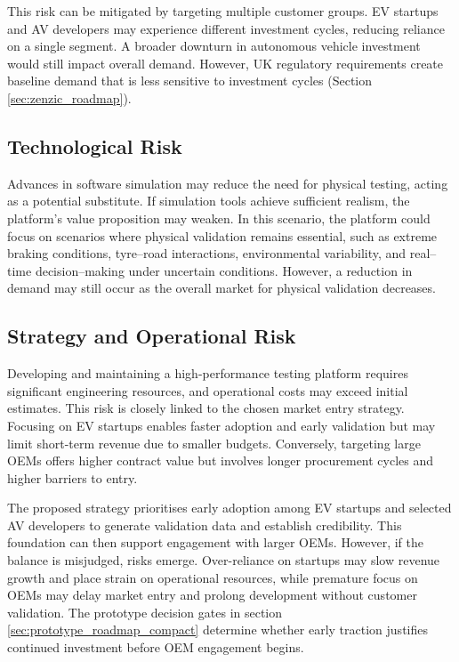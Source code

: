 \documentclass[11pt, a4paper]{report}
\numberwithin{equation}{section}
\begin{document}
\begin{refsection}
This risk can be mitigated by targeting multiple customer groups. EV startups and AV developers may experience different investment cycles, reducing reliance on a single segment. A broader downturn in autonomous vehicle investment would still impact overall demand. However, UK regulatory requirements create baseline demand that is less sensitive to investment cycles (Section \ref{sec:zenzic_roadmap}).

\subsection{Technological Risk}

Advances in software simulation may reduce the need for physical testing, acting as a potential substitute. If simulation tools achieve sufficient realism, the platform’s value proposition may weaken. In this scenario, the platform could focus on scenarios where physical validation remains essential, such as extreme braking conditions, tyre–road interactions, environmental variability, and real--time decision--making under uncertain conditions. However, a reduction in demand may still occur as the overall market for physical validation decreases.

\subsection{Strategy and Operational Risk}

Developing and maintaining a high-performance testing platform requires significant engineering resources, and operational costs may exceed initial estimates. This risk is closely linked to the chosen market entry strategy. Focusing on EV startups enables faster adoption and early validation but may limit short-term revenue due to smaller budgets. Conversely, targeting large OEMs offers higher contract value but involves longer procurement cycles and higher barriers to entry.

The proposed strategy prioritises early adoption among EV startups and selected AV developers to generate validation data and establish credibility. This foundation can then support engagement with larger OEMs. However, if the balance is misjudged, risks emerge. Over-reliance on startups may slow revenue growth and place strain on operational resources, while premature focus on OEMs may delay market entry and prolong development without customer validation. The prototype decision gates in section \ref{sec:prototype_roadmap_compact} determine whether early traction justifies continued investment before OEM engagement begins.


\end{refsection}
\end{document}
